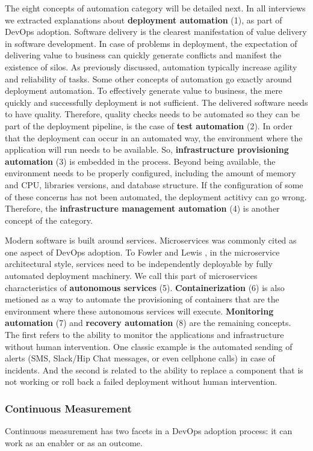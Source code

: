 The eight concepts of automation category will be detailed next.
In all interviews we extracted explanations about \textbf{deployment
automation} (1), as part of DevOps adoption. Software delivery is the clearest
manifestation of value delivery in software development. In case of problems
in deployment, the expectation of delivering value to business can quickly
generate conflicts and manifest the existence of silos. As previously discussed,
automation typically increase agility and reliability of tasks. Some other
concepts of automation go exactly around deployment automation. To
effectively generate value to business, the mere quickly and successfully
deployment is not sufficient. The delivered software needs to have quality.
Therefore, quality checks needs to be automated so they can be part of the
deployment pipeline, is the case of \textbf{test automation} (2). In order
that the deployment can occur in an automated way, the environment where the
application will run needs to be available. So, \textbf{infrastructure
provisioning automation} (3) is embedded in the process. Beyond being available,
the environment needs to be properly configured, including the amount of memory and CPU,
libraries versions, and database structure. If the configuration of some of these concerns
has not been automated, the deployment actitivy can go wrong. Therefore,
the \textbf{infrastructure management automation} (4) is another
concept of the  category.

Modern software is built around services. Microservices  was commonly cited
as one aspect of DevOps adoption. To Fowler and Lewis
\cite{martinfowler2014microservices}, in the
microservice architectural style, services need to be independently deployable
by fully automated deployment machinery. We call this part of microservices
characteristics of \textbf{autonomous services} (5). \textbf{Containerization}
(6) is also metioned as a way to automate the provisioning of containers that are the
environment where these autonomous services will execute.
\textbf{Monitoring automation} (7) and \textbf{recovery automation} (8) are the
remaining concepts. The first refers to the ability to monitor the
applications and infrastructure without human intervention. One classic example
is the automated sending of alerts (SMS, Slack/Hip Chat messages, or even
cellphone calls) in case of incidents. And the second is related to the ability
to replace a component that is not working or
roll back a failed deployment without human intervention.


\subsubsection{Continuous Measurement}
Continuous measurement has two facets in a DevOps adoption process: it can work
as an enabler or as an outcome.

